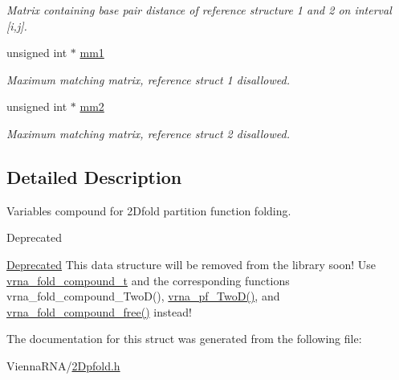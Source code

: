 \begin{DoxyCompactItemize}
\begin{DoxyCompactList}\small\item\em Matrix containing base pair distance of reference structure 1 and 2 on interval \mbox{[}i,j\mbox{]}. \end{DoxyCompactList}\item 
\hypertarget{structTwoDpfold__vars_a7c9e9af6224d4696118e05835441863d}{unsigned int $\ast$ \hyperlink{structTwoDpfold__vars_a7c9e9af6224d4696118e05835441863d}{mm1}}\label{structTwoDpfold__vars_a7c9e9af6224d4696118e05835441863d}

\begin{DoxyCompactList}\small\item\em Maximum matching matrix, reference struct 1 disallowed. \end{DoxyCompactList}\item 
\hypertarget{structTwoDpfold__vars_affb913470783f9edb12a0bfc22466269}{unsigned int $\ast$ \hyperlink{structTwoDpfold__vars_affb913470783f9edb12a0bfc22466269}{mm2}}\label{structTwoDpfold__vars_affb913470783f9edb12a0bfc22466269}

\begin{DoxyCompactList}\small\item\em Maximum matching matrix, reference struct 2 disallowed. \end{DoxyCompactList}\end{DoxyCompactItemize}


\subsection{Detailed Description}
Variables compound for 2\-Dfold partition function folding. 

\begin{DoxyRefDesc}{Deprecated}
\item[\hyperlink{deprecated__deprecated000006}{Deprecated}]This data structure will be removed from the library soon! Use \hyperlink{group__fold__compound_ga1b0cef17fd40466cef5968eaeeff6166}{vrna\-\_\-fold\-\_\-compound\-\_\-t} and the corresponding functions vrna\-\_\-fold\-\_\-compound\-\_\-\-Two\-D(), \hyperlink{group__kl__neighborhood__pf_ga0bc3427689bd09da09b8b3094a27f836}{vrna\-\_\-pf\-\_\-\-Two\-D()}, and \hyperlink{group__fold__compound_gadded6039d63f5d6509836e20321534ad}{vrna\-\_\-fold\-\_\-compound\-\_\-free()} instead! \end{DoxyRefDesc}


The documentation for this struct was generated from the following file\-:\begin{DoxyCompactItemize}
\item 
Vienna\-R\-N\-A/\hyperlink{2Dpfold_8h}{2\-Dpfold.\-h}\end{DoxyCompactItemize}
